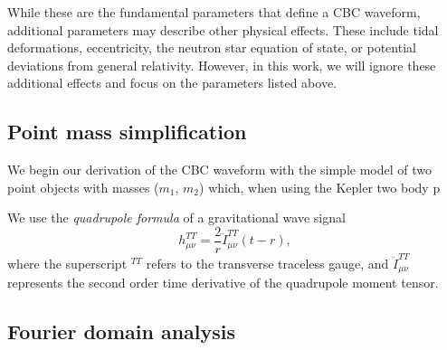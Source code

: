 While these are the fundamental parameters that define a CBC waveform, additional parameters may describe other physical effects. These include tidal deformations, eccentricity, the neutron star equation of state, or potential deviations from general relativity. However, in this work, we will ignore these additional effects and focus on the parameters listed above.

\subsection{\label{}Point mass simplification}

We begin our derivation of the CBC waveform with the simple model of two point objects with masses ($m_{1}$, $m_{2}$) which, when using the Kepler two body p

We use the \textit{quadrupole formula} of a gravitational wave signal
%
\begin{equation}
    h_{\mu\nu}^{TT} = \frac{2}{r} \ddot{I}_{\mu\nu}^{TT} (t-r),
\end{equation}
%
where the superscript $^{TT}$ refers to the transverse traceless gauge, and $\ddot{I}_{\mu\nu}^{TT}$ represents the second order time derivative of the quadrupole moment tensor.

\subsection{\label{}Fourier domain analysis}